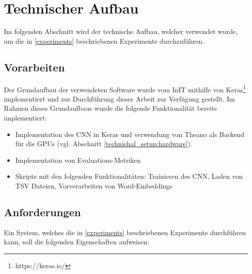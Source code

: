 



\section{Technischer Aufbau}
Im folgenden Abschnitt wird der technische Aufbau, welcher verwendet wurde, um die in \ref{experiments} beschriebenen Experimente durchzuführen.

\subsection{Vorarbeiten}
\label{technichal_setup:prework}
Der Grundaufbau der verwendeten Software wurde vom InIT mithilfe von Keras\footnote{https://keras.io/} implementiert und zur Durchführung dieser Arbeit zur Verfügung gestellt. Im Rahmen dieses Grundaufbaus wurde die folgende Funktionalität bereits implementiert:

\begin{itemize}[noitemsep]
	\item Implementation des CNN in Keras und verwendung von Theano \cite{theanoCitShort} als Backend für die GPUs (vgl. Abschnitt \ref{technichal_setup:hardware}).
	\item Implementation von Evaluations-Metriken
	\item Skripte mit den folgenden Funktionalitäten: Trainieren des CNN, Laden von TSV Dateien, Vorverarbeiten von Word-Embeddings
\end{itemize}

\subsection{Anforderungen}
\label{technical_setup:requirements}
Ein System, welches die in \ref{experiments} beschriebenen Experimente durchführen kann, soll die folgenden Eigenschaften aufweisen:

